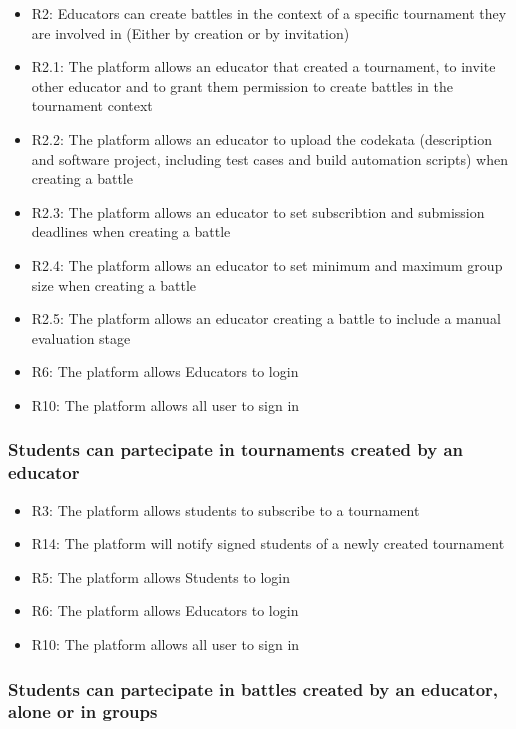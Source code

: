 \begin{itemize}
    \item R2: Educators can create battles in the context of a specific tournament they are involved in (Either by creation or by invitation)
    \item R2.1: The platform allows an educator that created a tournament, to invite other educator and to grant them permission to create battles in the tournament context
    \item R2.2: The platform allows an educator to upload the codekata (description and software project, including test cases and build automation scripts) when creating a battle
    \item R2.3: The platform allows an educator to set subscribtion and submission deadlines when creating a battle
    \item R2.4: The platform allows an educator to set minimum and maximum group size when creating a battle
    \item R2.5: The platform allows an educator creating a battle to include a manual evaluation stage
    \item R6: The platform allows Educators to login
    \item R10: The platform allows all user to sign in
\end{itemize}

\subsubsection{Students can partecipate in tournaments created by an educator}

\begin{itemize}
    \item R3: The platform allows students to subscribe to a tournament
    \item R14: The platform will notify signed students of a newly created tournament
    \item R5: The platform allows Students to login
    \item R6: The platform allows Educators to login
    \item R10: The platform allows all user to sign in
\end{itemize}

\subsubsection{Students can partecipate in battles created by an educator, alone or in groups}

